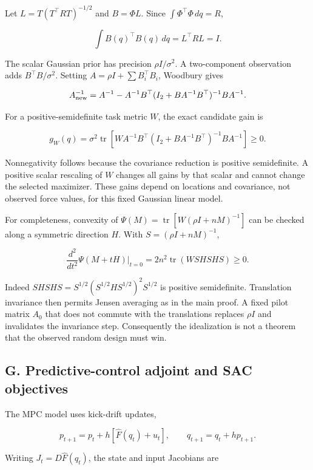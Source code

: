 \documentclass[
  10pt,
]{article}
\begin{document}
Let \(L=T(T^\top RT)^{-1/2}\) and \(B=\Phi L\). Since
\(\int\Phi^\top\Phi\,dq=R\),

\[\int B(q)^\top B(q)\,dq=L^\top RL=I.\]

The scalar Gaussian prior has precision \(\rho I/\sigma^2\). A
two-component observation adds \(B^\top B/\sigma^2\). Setting
\(A=\rho I+\sum B_i^\top B_i\), Woodbury gives

\[A_{\rm new}^{-1}=A^{-1}-A^{-1}B^\top(I_2+BA^{-1}B^\top)^{-1}BA^{-1}.\]

For a positive-semidefinite task metric \(W\), the exact candidate gain
is

\[g_W(q)=\sigma^2\operatorname{tr}\left[WA^{-1}B^\top(I_2+BA^{-1}B^\top)^{-1}BA^{-1}\right]\ge0.\]

Nonnegativity follows because the covariance reduction is positive
semidefinite. A positive scalar rescaling of \(W\) changes all gains by
that scalar and cannot change the selected maximizer. These gains depend
on locations and covariance, not observed force values, for this fixed
Gaussian linear model.

For completeness, convexity of
\(\Psi(M)=\operatorname{tr}[W(\rho I+nM)^{-1}]\) can be checked along a
symmetric direction \(H\). With \(S=(\rho I+nM)^{-1}\),

\[\frac{d^2}{dt^2}\Psi(M+tH)\bigg|_{t=0}
=2n^2\operatorname{tr}(WSHSHS)\ge0.\]

Indeed \(SHSHS=S^{1/2}(S^{1/2}HS^{1/2})^2S^{1/2}\) is positive
semidefinite. Translation invariance then permits Jensen averaging as in
the main proof. A fixed pilot matrix \(A_0\) that does not commute with
the translations replaces \(\rho I\) and invalidates the invariance
step. Consequently the idealization is not a theorem that the observed
random design must win.

\hypertarget{g.-predictive-control-adjoint-and-sac-objectives}{%
\subsection*{G. Predictive-control adjoint and SAC
objectives}\label{g.-predictive-control-adjoint-and-sac-objectives}}

The MPC model uses kick-drift updates,

\[p_{t+1}=p_t+h[\widehat F(q_t)+u_t],\qquad q_{t+1}=q_t+hp_{t+1}.\]

Writing \(J_t=D\widehat F(q_t)\), the state and input Jacobians are
\end{document}

